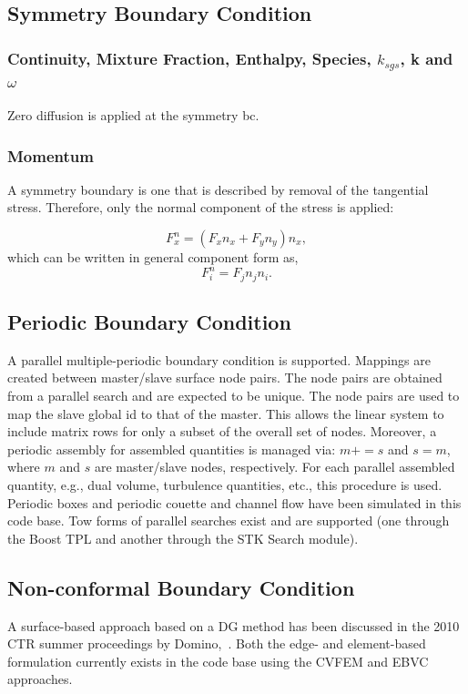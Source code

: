 {\subsection{Symmetry Boundary Condition}

\subsubsection{Continuity, Mixture Fraction, Enthalpy, Species, $k_{sgs}$, k and $\omega$}
Zero diffusion is applied at the symmetry bc.

\subsubsection{Momentum}
A symmetry boundary is one that is described by removal of the tangential stress. Therefore, only
the normal component of the stress is applied:

\begin{equation}
  F^n_x = (F_x n_x + F_y n_y ) n_x,
\end{equation}
which can be written in general component form as,
\begin{equation}
  F^n_i = F_j n_j n_i.
\end{equation}

\subsection{Periodic Boundary Condition}
A parallel multiple-periodic boundary condition is supported. Mappings are created between
master/slave surface node pairs. The node pairs are obtained from a parallel search and are expected
to be unique. The node pairs are used to map the slave global id to that of the master. This allows the linear
system to include matrix rows for only a subset of the overall set of nodes. Moreover, a periodic 
assembly for assembled quantities is managed via: $m+=s$ and $s=m$, where $m$ and $s$ are master/slave nodes, 
respectively. For each parallel assembled quantity, e.g., dual volume, turbulence quantities, etc., this procedure
is used. Periodic boxes and periodic couette and channel flow have been simulated in this code base. Tow forms of
parallel searches exist and are supported (one through the Boost TPL and another through the STK Search module).

\subsection{Non-conformal Boundary Condition}
A surface-based approach based on a DG method has been discussed in the 2010 CTR summer 
proceedings by Domino,~\cite{Domino:2010}. Both the edge- and element-based formulation 
currently exists in the code base using the CVFEM and EBVC approaches. 

}
